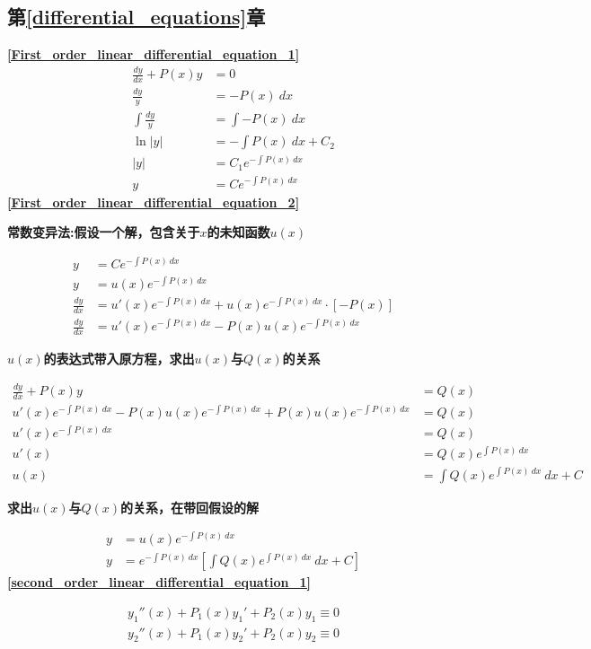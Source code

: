 \subsection{\centering 第\ref{differential_equations}章}
\textbf{\large \ref{First_order_linear_differential_equation_1}}
\begin{align*}
	\frac{dy}{dx}+P(x)y&=0\\
	\frac{dy}{y}&=-P(x)\ dx\\
	\int \frac{dy}{y}&=\int -P(x)\ dx\\
	\ln\left|y\right|&=-\int P(x)\ dx+C_2\\
	\left|y\right|&=C_1e^{-\int P(x)\ dx}\\
	y&=Ce^{-\int P(x)\ dx}
\end{align*}
\textbf{\large \ref{First_order_linear_differential_equation_2}}\\
\centerline{\textbf{常数变异法:假设一个解，包含关于$x$的未知函数$u(x)$}}
\begin{align*}
	y&=Ce^{-\int P(x)\ dx}\\
	y&=u(x)e^{-\int P(x)\ dx}\\
	\frac{dy}{dx}&=u'(x)e^{-\int P(x)\ dx}+u(x)e^{-\int P(x)\ dx}\cdot\left[-P(x)\right]\\
	\frac{dy}{dx}&=u'(x)e^{-\int P(x)\ dx}-P(x)u(x)e^{-\int P(x)\ dx}
\end{align*}
\centerline{\textbf{$u(x)$的表达式带入原方程，求出$u(x)$与$Q(x)$的关系}}
\begin{align*}
	\frac{dy}{dx}+P(x)y&=Q(x)\\
	u'(x)e^{-\int P(x)\ dx}-P(x)u(x)e^{-\int P(x)\ dx}+P(x)u(x)e^{-\int P(x)\ dx}&=Q(x)\\
	u'(x)e^{-\int P(x)\ dx}&=Q(x)\\
	u'(x)&=Q(x)e^{\int P(x)\ dx}\\
	u(x)&=\int Q(x)e^{\int P(x)\ dx}\ dx+C
\end{align*}
\centerline{\textbf{求出$u(x)$与$Q(x)$的关系，在带回假设的解}}
\begin{align*}
	y&=u(x)e^{-\int P(x)\ dx}\\
	y&=e^{-\int P(x)\ dx}\left[\int Q(x)e^{\int P(x)\ dx}\ dx+C\right]
\end{align*}
\textbf{\large \ref{second_order_linear_differential_equation_1}}\\
\begin{minipage}{.5\textwidth}
	\begin{align*}
y_1''(x)+P_1(x)y_1'+P_2(x)y_1\equiv 0\\
y_2''(x)+P_1(x)y_2'+P_2(x)y_2\equiv 0
	\end{align*}
\end{minipage}
